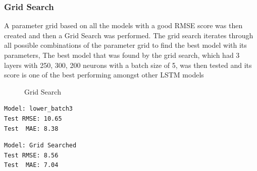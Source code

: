 ﻿\documentclass[10pt,11pt,12pt,oneside]{book}
\begin{document}
\subsubsection{Grid Search}
A parameter grid based on all the models with a good RMSE score was then created and then a Grid Search was performed. The grid search iterates through all possible combinations of the parameter grid to find the best model with its parameters, The best model that was found by the grid search, which had 3 layers with 250, 300, 200 neurons with a batch size of 5, was then tested and its score is one of the best performing amongst other LSTM models\\
\begin{figure}[H]
    \centering
    \qquad
    \caption{Grid Search}%
    \label{fig:grid}%
\end{figure}
\begin{multicols}{2}
\centering
\begin{verbatim}
Model: lower_batch3
Test RMSE: 10.65
Test  MAE: 8.38
\end{verbatim}
\begin{verbatim}
Model: Grid Searched
Test RMSE: 8.56
Test  MAE: 7.04
\end{verbatim}
\end{multicols}
\end{document}
